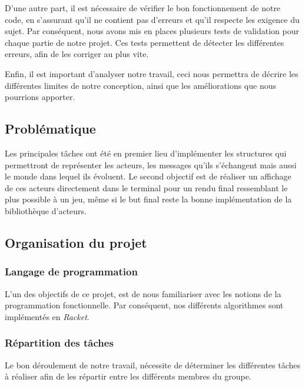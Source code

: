 \documentclass[a4paper,10pt]{article}
\begin{document}
D'une autre part, il est nécessaire de vérifier le bon fonctionnement de notre code, en s'assurant qu'il ne contient pas d'erreurs et qu'il respecte les exigence du sujet. Par conséquent, nous avons mis en places plusieurs tests de validation pour chaque partie de notre projet. Ces tests permettent de détecter les différentes erreurs, afin de les corriger au plus vite. 
\newline

Enfin, il est important d'analyser notre travail, ceci nous permettra de décrire les différentes limites de notre conception, ainsi que les améliorations que nous pourrions apporter.
 
\subsection{Problématique}

Les principales tâches ont été en premier lieu d'implémenter les structures qui permettront de représenter les acteurs, les messages qu'ils s'échangent mais aussi le monde dans lequel ils évoluent. Le second objectif est de réaliser un affichage de ces acteurs directement dans le terminal pour un rendu final ressemblant le plus possible à un jeu, même si le but final reste la bonne implémentation de la bibliothèque d'acteurs.

\subsection{Organisation du projet}
\subsubsection*{Langage de programmation}
L'un des objectifs de ce projet, est de nous familiariser avec les notions de la programmation fonctionnelle. Par conséquent, nos différents algorithmes sont implémentés en \textit{Racket}.
\subsubsection*{Répartition des tâches}
Le bon déroulement de notre travail, nécessite de déterminer les différentes tâches à réaliser afin de les répartir entre les différents membres du groupe.\\
\end{document}
